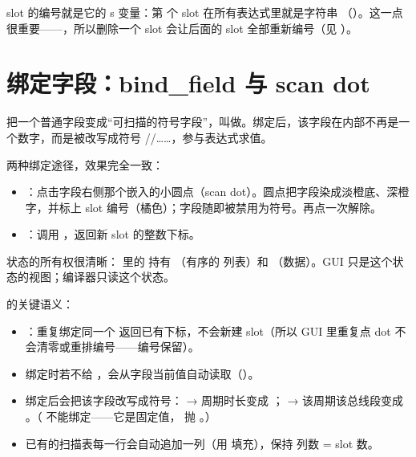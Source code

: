 \documentclass[11pt,oneside,openany]{book}
\begin{document}
slot 的编号就是它的 s 变量：第  个 slot 在所有表达式里就是字符串 （）。这一点很重要——，所以删除一个 slot 会让后面的 slot 全部重新编号（见 ）。

\section{绑定字段：bind\_field 与 scan dot}

把一个普通字段变成“可扫描的符号字段”，叫做。绑定后，该字段在内部不再是一个数字，而是被改写成符号 //……，参与表达式求值。

两种绑定途径，效果完全一致：

\begin{itemize}
\item {}：点击字段右侧那个嵌入的小圆点（scan dot）。圆点把字段染成淡橙底、深橙字，并标上 slot 编号（橘色）；字段随即被禁用为符号。再点一次解除。
\item {}：调用 ，返回新 slot 的整数下标。
\end{itemize}

状态的所有权很清晰： 里的  持有 （有序的  列表）和 （数据）。GUI 只是这个状态的视图；编译器只读这个状态。

 的关键语义：

\begin{itemize}
\item {}：重复绑定同一个  返回已有下标，不会新建 slot（所以 GUI 里重复点 dot 不会清零或重排编号——编号保留）。
\item 绑定时若不给 ，会从字段当前值自动读取（）。
\item 绑定后会把该字段改写成符号： → 周期时长变成 ； → 该周期该总线段变成 。（ 不能绑定——它是固定值， 抛 。）
\item 已有的扫描表每一行会自动追加一列（用  填充），保持  列数 = slot 数。
\end{itemize}
\end{document}
